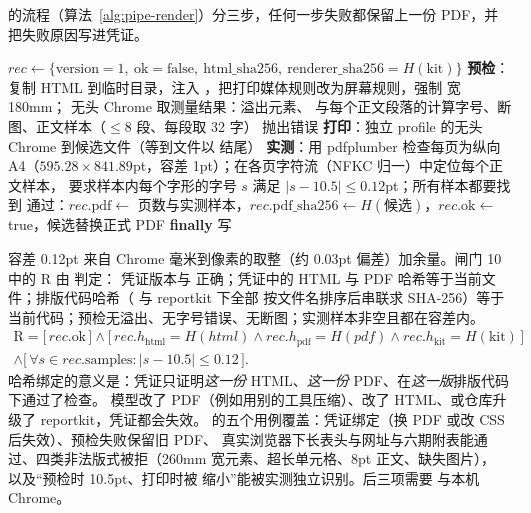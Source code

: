 的流程（算法~\ref{alg:pipe-render}）分三步，任何一步失败都保留上一份 PDF，并把失败原因写进凭证。

\begin{algorithm}[h]
\caption{带实测的打印 }
\label{alg:pipe-render}
\begin{algorithmic}[1]
\State $rec\gets\{\text{version}{=}1,\ \text{ok}{=}\text{false},\ \text{html\_sha256},\ \text{renderer\_sha256}{=}H(\text{kit})\}$
\State \textbf{预检}：复制 HTML 到临时目录，注入 ，把打印媒体规则改为屏幕规则，强制  宽 180mm；
\Statex \hspace{\algorithmicindent} 无头 Chrome  取测量结果：溢出元素、 与每个正文段落的计算字号、断图、正文样本（$\le 8$ 段、每段取 32 字）
 抛出错误 \EndIf
\State \textbf{打印}：独立 profile 的无头 Chrome  到候选文件（等到文件以  结尾）
\State \textbf{实测}：用 pdfplumber 检查每页为纵向 A4（$595.28\times841.89$pt，容差 1pt）；在各页字符流（NFKC 归一）中定位每个正文样本，
\Statex \hspace{\algorithmicindent} 要求样本内每个字形的字号 $s$ 满足 $|s-10.5|\le 0.12$pt；所有样本都要找到
\State 通过：$rec.\text{pdf}\gets$ 页数与实测样本，$rec.\text{pdf\_sha256}\gets H(\text{候选})$，$rec.\text{ok}\gets$ true，候选替换正式 PDF
\State \textbf{finally} 写 
\end{algorithmic}
\end{algorithm}

容差 0.12pt 来自 Chrome 毫米到像素的取整（约 0.03pt 偏差）加余量。闸门 10 中的 $\mathrm{R}$ 由  判定：
凭证版本与  正确；凭证中的 HTML 与 PDF 哈希等于当前文件；排版代码哈希（ 与 reportkit 下全部
 按文件名排序后串联求 SHA-256）等于当前代码；预检无溢出、无字号错误、无断图；实测样本非空且都在容差内。
\begin{multline}
  \mathrm{R}=\big[\,rec.\text{ok}\,\big]\wedge\big[\,rec.h_{\mathrm{html}}=H(\mathit{html})\wedge rec.h_{\mathrm{pdf}}=H(\mathit{pdf})\wedge rec.h_{\mathrm{kit}}=H(\mathrm{kit})\,\big]\\
  \wedge\big[\,\forall s\in rec.\text{samples}: |s-10.5|\le0.12\,\big].
\end{multline}
哈希绑定的意义是：凭证只证明\emph{这一份} HTML、\emph{这一份} PDF、在\emph{这一版}排版代码下通过了检查。
模型改了 PDF（例如用别的工具压缩）、改了 HTML、或仓库升级了 reportkit，凭证都会失效。
 的五个用例覆盖：凭证绑定（换 PDF 或改 CSS 后失效）、预检失败保留旧 PDF、
真实浏览器下长表头与网址与六期附表能通过、四类非法版式被拒（260mm 宽元素、超长单元格、8pt 正文、缺失图片），
以及“预检时 10.5pt、打印时被  缩小”能被实测独立识别。后三项需要  与本机 Chrome。

